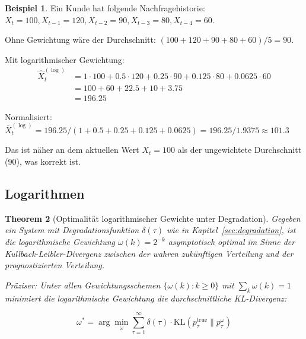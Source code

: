 \documentclass[a4paper, 12pt, twoside, openright]{report}
\newtheorem{theorem}{Theorem}[section]
\theoremstyle{definition}
\newtheorem{example}[theorem]{Beispiel}
\theoremstyle{definition}
\newcommand{\KL}{\mathrm{KL}}
\begin{document}
\begin{example}
Ein Kunde hat folgende Nachfragehistorie: $X_t = 100, X_{t-1} = 120, X_{t-2} = 90, X_{t-3} = 80, X_{t-4} = 60$.

Ohne Gewichtung wäre der Durchschnitt: $(100 + 120 + 90 + 80 + 60)/5 = 90$.

Mit logarithmischer Gewichtung:
\begin{align}
\hat{X}_t^{(\log)} &= 1 \cdot 100 + 0.5 \cdot 120 + 0.25 \cdot 90 + 0.125 \cdot 80 + 0.0625 \cdot 60 \\
&= 100 + 60 + 22.5 + 10 + 3.75 \\
&= 196.25
\end{align}

Normalisiert: $\bar{X}_t^{(\log)} = 196.25 / (1 + 0.5 + 0.25 + 0.125 + 0.0625) = 196.25 / 1.9375 \approx 101.3$

Das ist näher an dem aktuellen Wert $X_t = 100$ als der ungewichtete Durchschnitt (90), was korrekt ist.
\end{example}

\subsection{Logarithmen}

\begin{theorem}[Optimalität logarithmischer Gewichte unter Degradation]
\label{thm:log_optimal}
Gegeben ein System mit Degradationsfunktion $\delta(\tau)$ wie in Kapitel~\ref{sec:degradation}, ist die logarithmische Gewichtung $\omega(k) = 2^{-k}$ asymptotisch optimal im Sinne der Kullback-Leibler-Divergenz zwischen der wahren zukünftigen Verteilung und der prognostizierten Verteilung.

Präziser: Unter allen Gewichtungsschemen $\{\omega(k) : k \geq 0\}$ mit $\sum_k \omega(k) = 1$ minimiert die logarithmische Gewichtung die durchschnittliche KL-Divergenz:

\begin{equation}
\omega^* = \arg\min_{\omega} \sum_{\tau=1}^{\infty} \delta(\tau) \cdot \KL(p_\tau^{\text{true}} \parallel p_\tau^{\omega})
\label{eq:optimal_weighting}
\end{equation}
\end{theorem}
\end{document}
